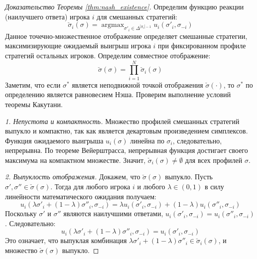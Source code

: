 \begin{proof}[Доказательство Теоремы \ref{thm:nash_existence}]
Определим функцию реакции (наилучшего ответа) игрока $i$ для смешанных стратегий:
\begin{equation}
    \check{\sigma}_i(\sigma) = \operatorname{argmax}_{\sigma'_i \in \Delta^{|S_i|-1}} u_i(\sigma'_i, \sigma_{-i})
\end{equation}
Данное точечно-множественное отображение определяет смешанные стратегии, максимизирующие ожидаемый выигрыш игрока $i$ при фиксированном профиле стратегий остальных игроков. 
Определим совместное отображение:
\begin{equation}
    \check{\sigma}(\sigma) = \prod_{i=1}^N \check{\sigma}_i(\sigma)
\end{equation}
Заметим, что если $\sigma^*$ является неподвижной точкой отображения $\check{\sigma}(\cdot)$, то $\sigma^*$ по определению является равновесием Нэша. Проверим выполнение условий теоремы Какутани.

\textit{1. Непустота и компактность.} Множество профилей смешанных стратегий выпукло и компактно, так как является декартовым произведением симплексов. Функция ожидаемого выигрыша $u_i(\sigma)$ линейна по $\sigma_i$, следовательно, непрерывна. По теореме Вейерштрасса, непрерывная функция достигает своего максимума на компактном множестве. Значит, $\check{\sigma}_i(\sigma) \neq \emptyset$ для всех профилей $\sigma$.

\textit{2. Выпуклость отображения.} Докажем, что $\check{\sigma}(\sigma)$ выпукло. Пусть $\sigma', \sigma'' \in \check{\sigma}(\sigma)$. Тогда для любого игрока $i$ и любого $\lambda \in (0, 1)$ в силу линейности математического ожидания получаем:
\begin{equation}
    u_i(\lambda\sigma'_i + (1 - \lambda)\sigma''_i, \sigma_{-i}) = \lambda u_i(\sigma'_i, \sigma_{-i}) + (1 - \lambda)u_i(\sigma''_i, \sigma_{-i})
\end{equation}
Поскольку $\sigma'$ и $\sigma''$ являются наилучшими ответами, $u_i(\sigma'_i, \sigma_{-i}) = u_i(\sigma''_i, \sigma_{-i})$. Следовательно:
\begin{equation}
    u_i(\lambda\sigma'_i + (1 - \lambda)\sigma''_i, \sigma_{-i}) = u_i(\sigma'_i, \sigma_{-i})
\end{equation}
Это означает, что выпуклая комбинация $\lambda\sigma'_i + (1 - \lambda)\sigma''_i \in \check{\sigma}_i(\sigma)$, и множество $\check{\sigma}(\sigma)$ выпукло.


\end{proof}
